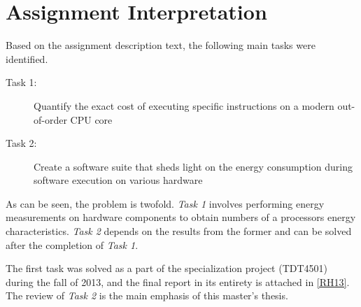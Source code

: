 \section{Assignment Interpretation}

Based on the assignment description text, the following main tasks were
identified.

\begin{description}
    \item[Task 1:] Quantify the exact cost of executing specific instructions on
        a modern out-of-order CPU core
    \item[Task 2:] Create a software suite that sheds light on the energy
        consumption during software execution on various hardware
\end{description}

As can be seen, the problem is twofold. \textit{Task 1} involves performing energy
measurements on hardware components to obtain numbers of a processors energy
characteristics. \textit{Task 2} depends on the results from the former and can
be solved after the completion of \textit{Task 1}.

The first task was solved as a part of the specialization project (TDT4501)
during the fall of 2013, and the final report in its entirety is attached in
\autoref{RH13}. The review of \textit{Task 2} is the main emphasis of this
master's thesis.
